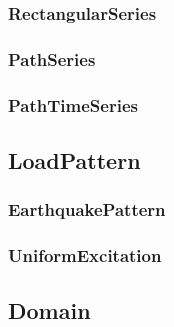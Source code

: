 \pagebreak
\subsubsection {RectangularSeries}


\pagebreak
\subsubsection {PathSeries}


\pagebreak
\subsubsection {PathTimeSeries}


\pagebreak
\subsection {LoadPattern}


\pagebreak
\subsubsection{\bf EarthquakePattern}


\pagebreak
\subsubsection{UniformExcitation}


\pagebreak
\subsection{Domain}


%

%

%

